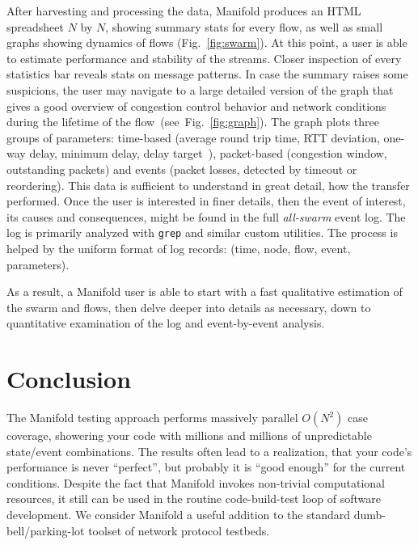 \documentclass[conference]{IEEEtran}
\begin{document}
After harvesting and processing the data, Manifold produces an HTML spreadsheet $N$ by $N$, showing summary stats for every flow, as well as small graphs showing dynamics of flows (Fig.~\ref{fig:swarm}).
At this point, a user is able to estimate performance and stability of the streams. Closer inspection of every statistics bar reveals stats on message patterns. In case the summary raises some suspicions, the user may navigate to a large detailed version of the graph that gives a good overview of congestion control behavior and network conditions during the lifetime of the flow~(see~Fig.~\ref{fig:graph}). The graph plots three groups of parameters: time-based (average round trip time, RTT deviation, one-way delay, minimum delay, delay target~\cite{ledbat}), packet-based (congestion window, outstanding packets) and events (packet losses, detected by timeout or  reordering). This data is sufficient to understand in great detail, how the transfer performed. Once the user is interested in finer details, then the event of interest, its causes and consequences, might be found in the full \emph{all-swarm} event log. The log is primarily analyzed with {\tt grep} and similar custom utilities. The process is helped by the uniform format of log records: (time, node, flow, event, parameters).
     

As a result, a Manifold user is able to start with a fast qualitative estimation of the swarm and flows, then delve deeper into details as necessary, down to quantitative examination of the log and event-by-event analysis.

\section{Conclusion}

The Manifold testing approach performs massively parallel $O(N^{2})$ case coverage, showering your code with millions and millions of unpredictable state/event combinations.
The results often lead to a  realization, that your code's performance is never ``perfect'', but probably it is ``good enough'' for the current conditions.
Despite the fact that Manifold invokes non-trivial computational resources, it still can be used in the routine code-build-test loop of software development.
We consider Manifold a useful addition to the standard dumb-bell/parking-lot toolset of network protocol testbeds.




\end{document}
